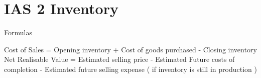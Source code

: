 \newpage

\section{IAS 2 Inventory}

Formulas

Cost of Sales = Opening inventory + Cost of goods purchased - Closing inventory
Net Realisable Value = Estimated selling price - Estimated Future costs of completion - Estimated future selling expense ( if inventory is still in production )
